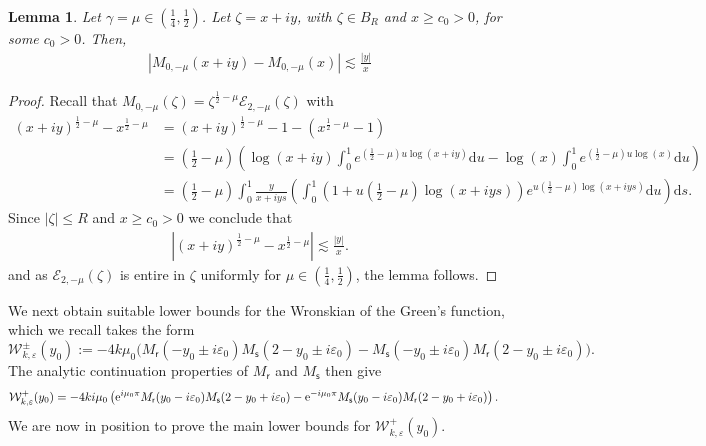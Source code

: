 \documentclass[11pt,reqno]{amsproc}
\newtheorem{lemma}[proposition]{Lemma}
\theoremstyle{definition}
\numberwithin{equation}{section}
\newcommand{\sr}{{\mathsf{r}}}
\newcommand{\s}{{\mathsf{s}}}
\newcommand{\W}{{\mathcal{W}}}
\renewcommand{\d}{\mathrm{d}}
\newcommand{\ep}{\varepsilon}
\newcommand\e{{\rm e}}
\begin{document}
\begin{lemma}\label{lemma:fragileMlimit}
Let $\gamma =\mu \in \left( \frac14, \frac12 \right)$. Let $\zeta = x+iy$, with $\zeta\in B_R$ and $x\geq c_0>0$, for some $c_0>0$. Then,
\begin{align*}
\left| M_{0,-\mu}(x+iy) - M_{0,-\mu}(x) \right| \lesssim \frac{|y|}{x}
\end{align*}
\end{lemma}

\begin{proof}
Recall that $M_{0,-\mu}(\zeta)=\zeta^{\frac12-\mu}\mathcal{E}_{2,-\mu}(\zeta)$ with
\begin{align*}
(x+iy)^{\frac12-\mu} - x^{\frac12-\mu} &= (x+iy)^{\frac12-\mu} - 1 - \left( x^{\frac12-\mu} - 1 \right)  \\
&= \left(\tfrac12-\mu \right) \left( \log(x+iy)\int_0^1 e^{(\frac12-\mu)u \log(x+iy)} \d u  - \log(x)\int_0^1 e^{(\frac12-\mu)u \log(x)} \d u \right) \\
&= \left(\tfrac12 - \mu\right) \int_0^1 \frac{y}{x+iys} \left( \int_0^1 \left( 1 + u\left(\tfrac12-\mu \right)\log(x+iys) \right) e^{u \left(\frac12-\mu\right) \log(x+iys)} \d u \right) \d s .
\end{align*}
Since $|\zeta|\leq R$ and $x\geq c_0>0$ we conclude that
\begin{align*}
\left| (x+iy)^{\frac12-\mu} - x^{\frac12-\mu} \right| \lesssim \frac{|y|}{x}.
\end{align*}
and as $\mathcal{E}_{2,-\mu}(\zeta)$ is entire in $\zeta$ uniformly for $ \mu \in \left( \frac14, \frac12 \right)$, the lemma follows.
\end{proof}

We next obtain suitable lower bounds for the Wronskian of the Green's function, which we recall takes the form
\begin{equation*}
\W_{k,\ep}^\pm(y_0):= -4k \mu_0\Big( M_\sr( - y_0\pm i\ep_0)M_\s(2 - y_0\pm i\ep_0) - M_\s( - y_0\pm i\ep_0)M_\sr(2-y_0\pm i\ep_0) \Big).
\end{equation*} 
The analytic continuation properties of $M_\sr$ and $M_\s$ then give
\begin{align*}
\W_{k,\ep}^+(y_0)&=-4ki\mu_0\left( \e^{i\mu_0\pi}M_\sr(y_0-i\ep_0)M_\s(2-y_0+i\ep_0)-\e^{-i\mu_0\pi}M_\s(y_0-i\ep_0)M_\sr(2-y_0+i\ep_0)\right).
\end{align*}
We are now in position to prove the main lower bounds for $\W_{k,\ep}^+(y_0)$.
\end{document}
